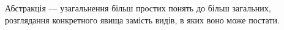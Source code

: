 Абстракція --- узагальнення більш простих понять до більш загальних, розглядання
конкретного явища замість видів, в яких воно може постати.
